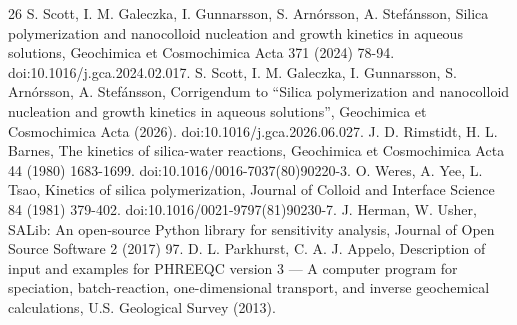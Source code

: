 \documentclass[review,number,sort&compress]{elsarticle}
\begin{document}
\begin{thebibliography}{26}
 S. Scott, I. M. Galeczka, I. Gunnarsson, S. Arn\'orsson, A. Stef\'ansson, Silica polymerization and nanocolloid nucleation and growth kinetics in aqueous solutions, Geochimica et Cosmochimica Acta 371 (2024) 78-94. doi:10.1016/j.gca.2024.02.017.
 S. Scott, I. M. Galeczka, I. Gunnarsson, S. Arn\'orsson, A. Stef\'ansson, Corrigendum to ``Silica polymerization and nanocolloid nucleation and growth kinetics in aqueous solutions'', Geochimica et Cosmochimica Acta (2026). doi:10.1016/j.gca.2026.06.027.
 J. D. Rimstidt, H. L. Barnes, The kinetics of silica-water reactions, Geochimica et Cosmochimica Acta 44 (1980) 1683-1699. doi:10.1016/0016-7037(80)90220-3.
 O. Weres, A. Yee, L. Tsao, Kinetics of silica polymerization, Journal of Colloid and Interface Science 84 (1981) 379-402. doi:10.1016/0021-9797(81)90230-7.
 J. Herman, W. Usher, SALib: An open-source Python library for sensitivity analysis, Journal of Open Source Software 2 (2017) 97.
 D. L. Parkhurst, C. A. J. Appelo, Description of input and examples for PHREEQC version 3 --- A computer program for speciation, batch-reaction, one-dimensional transport, and inverse geochemical calculations, U.S. Geological Survey (2013).
\end{thebibliography}
\end{document}
